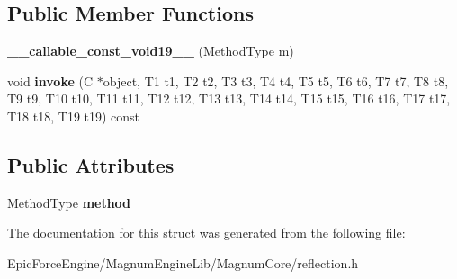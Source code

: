 \subsection*{Public Member Functions}
\begin{DoxyCompactItemize}
\item 
{\bfseries \+\_\+\+\_\+callable\+\_\+const\+\_\+void19\+\_\+\+\_\+} (Method\+Type m)\hypertarget{structagm_1_1reflection_1_1____callable__const__void19_____a94c15c86e736a3179624a9ae3208bb5c}{}\label{structagm_1_1reflection_1_1____callable__const__void19_____a94c15c86e736a3179624a9ae3208bb5c}

\item 
void {\bfseries invoke} (C $\ast$object, T1 t1, T2 t2, T3 t3, T4 t4, T5 t5, T6 t6, T7 t7, T8 t8, T9 t9, T10 t10, T11 t11, T12 t12, T13 t13, T14 t14, T15 t15, T16 t16, T17 t17, T18 t18, T19 t19) const \hypertarget{structagm_1_1reflection_1_1____callable__const__void19_____ae382caf5fb83adc55e76cc8b02fd5db9}{}\label{structagm_1_1reflection_1_1____callable__const__void19_____ae382caf5fb83adc55e76cc8b02fd5db9}

\end{DoxyCompactItemize}
\subsection*{Public Attributes}
\begin{DoxyCompactItemize}
\item 
Method\+Type {\bfseries method}\hypertarget{structagm_1_1reflection_1_1____callable__const__void19_____ae79a64ac8a84ea155d1daeaea541243f}{}\label{structagm_1_1reflection_1_1____callable__const__void19_____ae79a64ac8a84ea155d1daeaea541243f}

\end{DoxyCompactItemize}


The documentation for this struct was generated from the following file\+:\begin{DoxyCompactItemize}
\item 
Epic\+Force\+Engine/\+Magnum\+Engine\+Lib/\+Magnum\+Core/reflection.\+h\end{DoxyCompactItemize}
